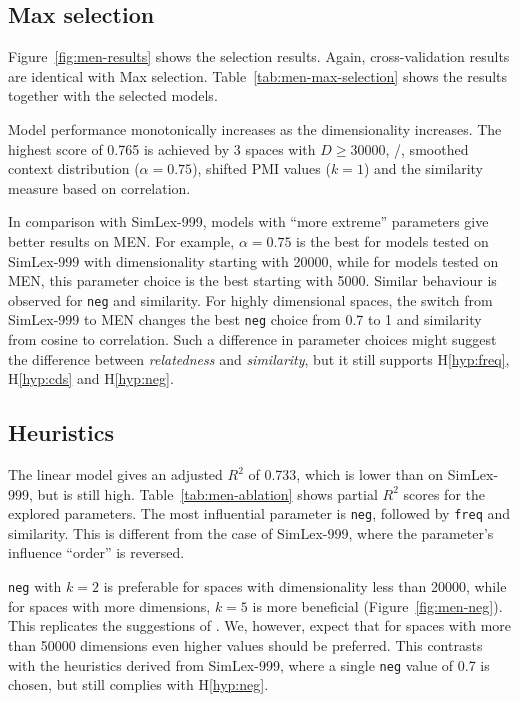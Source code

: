 \subsection{Max selection}
\label{sec:max-selection-men}



Figure~\ref{fig:men-results} shows the selection results. Again, cross-validation results are identical with Max selection. Table~\ref{tab:men-max-selection} shows the results together with the selected models.



Model performance monotonically increases as the dimensionality increases. The highest score of 0.765 is achieved by 3 spaces with $D \geq 30000$, \logNSCPMI/, smoothed context distribution ($\alpha = 0.75$), shifted PMI values ($k = 1$) and the similarity measure based on correlation.

In comparison with SimLex-999, models with ``more extreme'' parameters give better results on MEN. For example, $\alpha = 0.75$ is the best for models tested on SimLex-999 with dimensionality starting with 20000, while for models tested on MEN, this parameter choice is the best starting with 5000. Similar behaviour is observed for \texttt{neg} and similarity. For highly dimensional spaces, the switch from SimLex-999 to MEN changes the best \texttt{neg} choice from 0.7 to 1 and similarity from cosine to correlation. Such a difference in parameter choices might suggest the difference between \textit{relatedness} and \textit{similarity}, but it still supports H\ref{hyp:freq}, H\ref{hyp:cds} and H\ref{hyp:neg}.

\subsection{Heuristics}
\label{sec:heuristics-men}




The linear model gives an adjusted $R^2$ of 0.733, which is lower than on SimLex-999, but is still high. Table~\ref{tab:men-ablation} shows partial $R^2$ scores for the explored parameters. The most influential parameter is \texttt{neg}, followed by \texttt{freq} and similarity. This is different from the case of SimLex-999, where the parameter's influence ``order'' is reversed.


\texttt{neg} with $k = 2$ is preferable for spaces with dimensionality less than 20000, while for spaces with more dimensions,
% 
% 
$k = 5$ is more beneficial (Figure~\ref{fig:men-neg}). This replicates the suggestions of . We, however, expect that for spaces with more than 50000 dimensions even higher values should be preferred. This contrasts with the heuristics derived from SimLex-999, where a single \texttt{neg} value of 0.7 is chosen, but still complies with H\ref{hyp:neg}.

